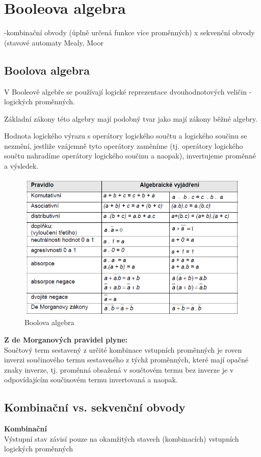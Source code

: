 \section{Booleova algebra}
-kombinační obvody (úplně určená funkce více proměnných) x sekvenční obvody (stavové automaty Mealy, Moor
\subsection{Boolova algebra}
V Booleově algebře se používají logické
reprezentace dvouhodnotových veličin - logických
proměnných.

Základní zákony této algebry mají podobný tvar
jako mají zákony běžné algebry.

Hodnota logického výrazu s operátory logického
součtu a logického součinu se nezmění, jestliže
vzájemně tyto operátory zaměníme (tj. operátory
logického součtu nahradíme operátory logického
součinu a naopak), invertujeme proměnné
a výsledek.
   \begin{figure}[h]
   \begin{center}
     \includegraphics[scale=0.6]{images/Bool.png}
   \end{center}
   \caption{Boolova algebra}
  \end{figure}


\textbf{Z de Morganových pravidel plyne:}\\
Součtový term sestavený z určité kombinace vstupních proměnných je
roven inverzi součinového termu sestaveného z týchž proměnných, které
mají opačné znaky inverze, tj. proměnná obsažená v součtovém termu
bez inverze je v odpovídajícím součinovém termu invertovaná
a naopak.

\subsection{Kombinační vs. sekvenční obvody}
\textbf{Kombinační}\\
Výstupní stav závisí pouze na okamžitých stavech (kombinacích) vstupních logických proměnných\\

